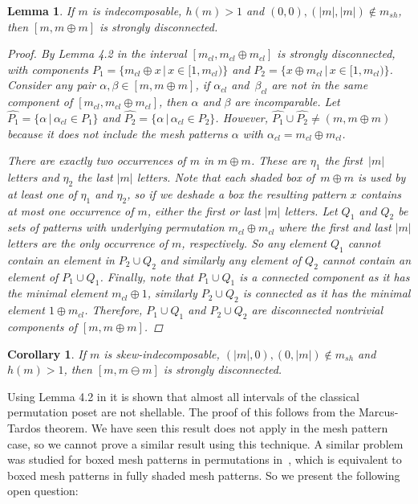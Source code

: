 \documentclass[preprint,11pt]{elsarticle}
\newtheorem{lem}[thm]{Lemma}\crefname{lem}{Lemma}{Lemmas}
\newtheorem{cor}[thm]{Corollary}\crefname{cor}{Corollary}{Corollaries}
\newcommand\cl[1]{#1_{cl}}
\newcommand\sh[1]{#1_{sh}}
\newcommand\h{h}
\numberwithin{equation}{section}
\numberwithin{figure}{section}
\numberwithin{thm}{section}
\begin{document}
\begin{lem}
If $m$ is indecomposable, $\h(m) > 1$ and $(0,0),(|m|,|m|)\not\in\sh{m}$, then
$[m,m\oplus m]$ is strongly disconnected.
\begin{proof}
By Lemma 4.2 in \cite{McSt13} the interval $[\cl{m},\cl{m}\oplus \cl{m}]$ is strongly disconnected,
with components $P_1=\{\cl{m}\oplus x\,|\,x\in [1,\cl{m})\}$ and
$P_2=\{x\oplus \cl{m}\,|\,x\in [1,\cl{m})\}$. Consider any pair $\alpha,\beta\in[m,m\oplus m]$,
if $\cl{\alpha}$ and~$\cl{\beta}$ are not in the same component of  $[\cl{m},\cl{m}\oplus \cl{m}]$,
then $\alpha$ and $\beta$ are incomparable. Let $\hat{P_1}=\{\alpha\,|\,\cl{\alpha}\in P_1\}$
and $\hat{P_2}=\{\alpha\,|\,\cl{\alpha}\in P_2\}$. However, ${\hat{P_1}\cup\hat{P_2}\not=(m,m\oplus m)}$
because it does not include the mesh patterns $\alpha$ with ${\cl{\alpha}=\cl{m}\oplus \cl{m}}$.

There are exactly two occurrences of $m$ in $m\oplus m$. These are $\eta_1$ the first~$|m|$ letters
and $\eta_2$ the last $|m|$ letters. Note that each shaded box of~${m\oplus m}$ is used by at least one
of $\eta_1$ and $\eta_2$, so if we deshade a box the resulting pattern $x$ contains at most one occurrence of $m$,
either the first or last $|m|$ letters. Let $Q_1$ and $Q_2$ be sets of patterns with underlying permutation
$\cl{m}\oplus \cl{m}$ where the first and last $|m|$ letters are the only occurrence of $m$, respectively. So any
element $Q_1$ cannot contain an element in $P_2\cup Q_2$ and similarly any element of $Q_2$ cannot
contain an element of ${P_1\cup Q_1}$. Finally, note that $P_1\cup Q_1$ is a connected component as it has the minimal element
$\cl{m}\oplus1$, similarly $P_2\cup Q_2$ is connected as it has the minimal element $1\oplus\cl{m}$.
Therefore, $P_1\cup Q_1$ and $P_2\cup Q_2$ are disconnected
nontrivial components of $[m,m\oplus m]$.
\end{proof}
\end{lem}
\begin{cor}
If $m$ is skew-indecomposable, $(|m|,0),(0,|m|) \not\in\sh{m}$ and $\h(m)>1$, then
$[m,m\ominus m]$ is strongly disconnected.
\end{cor}

Using Lemma 4.2 in \cite{McSt13} it is shown that
almost all intervals of the classical permutation poset are not shellable. The
proof of this follows from the Marcus-Tardos theorem. We have seen this result
does not apply in the mesh pattern case, so we cannot prove a similar result
using this technique.  A similar problem was studied for boxed mesh patterns in
permutations in~\cite{AKV13}, which is equivalent to boxed mesh patterns in
fully shaded mesh patterns. So we present the following open question:
\end{document}
